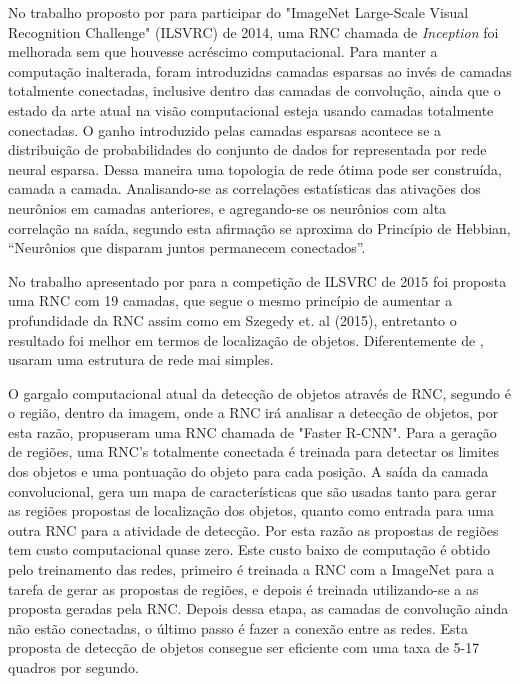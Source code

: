 \documentclass[
	12pt,				%
    oneside,			%
	a4paper,			%
	english,			%
	french,				%
	spanish,			%
	brazil,				%
	]{abntex2}
\begin{document}
No trabalho proposto por  para participar do "ImageNet Large-Scale Visual Recognition Challenge" (ILSVRC) de 2014, uma RNC chamada de \textit{Inception} foi melhorada sem que houvesse acréscimo computacional. Para manter a computação inalterada, foram introduzidas camadas esparsas ao invés de camadas totalmente conectadas, inclusive dentro das camadas de convolução, ainda que o estado da arte atual na visão computacional esteja usando camadas totalmente conectadas. O ganho introduzido pelas camadas esparsas acontece se a distribuição de probabilidades do conjunto de dados for representada por rede neural esparsa. Dessa maneira uma topologia de rede ótima pode ser construída, camada a camada. Analisando-se  as correlações estatísticas das ativações dos neurônios em camadas anteriores, e agregando-se os neurônios  com alta correlação na saída,  segundo  esta afirmação se aproxima do Princípio de Hebbian, “Neurônios que disparam juntos permanecem conectados”. 

No trabalho apresentado por  para a competição de ILSVRC de 2015 foi proposta uma RNC com 19 camadas, que segue o mesmo princípio de aumentar a profundidade da RNC assim como em Szegedy et. al (2015), entretanto o resultado foi melhor em termos de localização de objetos. Diferentemente de ,  usaram uma estrutura de rede mai simples.

O gargalo computacional atual da detecção de objetos através de RNC, segundo  é o região, dentro da imagem, onde a RNC irá analisar a detecção de objetos, por esta razão,  propuseram uma RNC chamada de "Faster R-CNN". Para a geração de regiões, uma RNC’s totalmente conectada é treinada para detectar os limites dos objetos e uma pontuação do objeto para cada posição. A saída da camada convolucional, gera um mapa de características que são usadas tanto para gerar as regiões propostas de localização dos objetos, quanto como entrada para uma outra RNC para a atividade de detecção. Por esta razão as propostas de regiões tem custo computacional quase zero. Este custo baixo de computação é obtido pelo treinamento das redes, primeiro é treinada a RNC com a ImageNet para a tarefa de gerar as propostas de regiões, e depois é treinada utilizando-se a as proposta geradas pela RNC. Depois dessa etapa, as camadas de convolução ainda não estão conectadas, o último passo é fazer a conexão entre as redes. Esta proposta de detecção de objetos consegue ser eficiente com uma taxa de 5-17 quadros por segundo.
\end{document}
